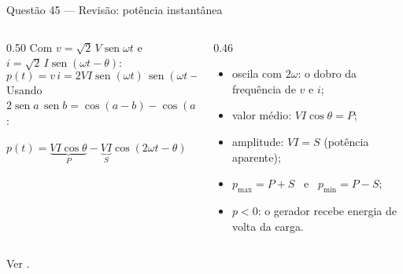 \documentclass[aspectratio=169]{../../TemplateBeamerUFC/libs/ufc_format}
\providecommand{\sen}{\operatorname{sen}}   %
\begin{document}
\begin{frame}{Questão 45 --- Revisão: potência instantânea}
  \small
  \begin{columns}[T]
    \begin{column}{0.50\textwidth}
      Com $v = \sqrt{2}\,V\sen\omega t$ e $i = \sqrt{2}\,I\sen(\omega t -
      \theta)$:
      \[
        p(t) = v\,i = 2VI\sen(\omega t)\,\sen(\omega t - \theta)
      \]
      Usando $2\sen a\,\sen b = \cos(a-b) - \cos(a+b)$:
      \begin{conceito}[left=3pt,right=3pt]
        \centering
        $p(t) = {\underbrace{VI\cos\theta}_{P}}
              - {\underbrace{VI}_{S}}\cos(2\omega t - \theta)$
      \end{conceito}
    \end{column}
    \begin{column}{0.46\textwidth}
      \pause
      \begin{itemize}
        \item oscila com $2\omega$: o dobro da frequência de $v$ e $i$;
        \item valor médio: $VI\cos\theta = P$;
        \item amplitude: $VI = S$ (potência aparente);
        \item $p_{\max} = P + S$ \ e \ $p_{\min} = P - S$;
        \item $p < 0$: o gerador recebe energia de volta da carga.
      \end{itemize}
    \end{column}
  \end{columns}
  \vfill
  {\footnotesize\color{black!55} Ver \cite{stevenson1986elementos}.}
\end{frame}
\end{document}

